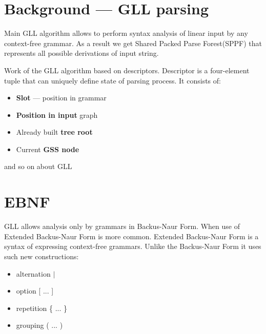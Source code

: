 \documentclass[runningheads,a4paper]{llncs}
\begin{document}






\section{Background --- GLL parsing}%

Main GLL algorithm\cite{scott2010gll} allows to perform syntax analysis of linear input by any context-free 
grammar. As a result we get Shared Packed Parse Forest(SPPF) that represents all possible derivations of input string.

Work of the GLL algorithm based on descriptors. Descriptor is a four-element tuple that can uniquely define state 
of parsing process. It consists of:
\begin{itemize}
    \item \textbf{Slot} --- position in grammar
    \item \textbf{Position in input} graph
    \item Already built \textbf{tree root}
    \item Current \textbf{GSS node}
\end{itemize}

and so on about GLL

\section{EBNF}%

GLL allows analysis only by grammars in Backus-Naur Form. When use of Extended Backus-Naur Form is more common.
Extended Backus-Naur Form is a syntax of expressing context-free grammars. Unlike the Backus-Naur Form it 
uses such new constructions:
\begin{itemize}
    \item alternation $\mid$
    \item option [ ... ]
    \item repetition \{ ... \}
    \item grouping ( ... )
\end{itemize}
\end{document}
